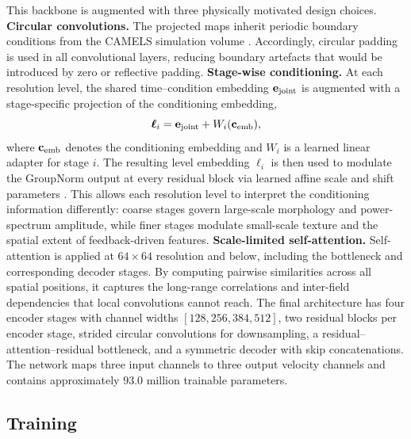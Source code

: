 \documentclass{article}
\begin{document}
This backbone is augmented with three physically motivated design
choices. \textbf{Circular convolutions.}
The projected maps inherit periodic boundary conditions from the
CAMELS simulation volume \citep{Villaescusa2022}. Accordingly,
circular padding is used in all convolutional layers, reducing boundary
artefacts that would be introduced by zero or reflective padding.
\textbf{Stage-wise conditioning.}
At each resolution level, the shared time--condition embedding
$\mathbf{e}_{\rm joint}$ is augmented with a
stage-specific projection of the conditioning embedding,
\begin{equation}
  \boldsymbol{\ell}_i
  =
  \mathbf{e}_{\rm joint} + W_i(\mathbf{c}_{\rm emb}),
  \label{eq:stage_embedding}
\end{equation}
where $\mathbf{c}_{\rm emb}$ denotes the conditioning embedding and
$W_i$ is a learned linear adapter for stage $i$. The
resulting level embedding $\boldsymbol{\ell}_i$ is then used to
modulate the GroupNorm \citep{Wu2018} output at every residual block
via learned affine scale and shift parameters \citep[FiLM;][]{Perez2018}.
This allows each resolution level to interpret the conditioning
information differently: coarse stages govern large-scale morphology
and power-spectrum amplitude, while finer stages modulate small-scale
texture and the spatial extent of feedback-driven features.
\textbf{Scale-limited self-attention.}
Self-attention \citep{Vaswani2017} is applied at $64\times64$
resolution and below, including the bottleneck and corresponding
decoder stages. By computing pairwise similarities across all spatial
positions, it captures the long-range correlations and
inter-field dependencies that local convolutions cannot reach.
The final architecture has four encoder stages with channel widths
$[128, 256, 384, 512]$, two residual blocks per encoder stage,
strided circular convolutions for downsampling, a
residual--attention--residual bottleneck, and a symmetric decoder
with skip concatenations. The network maps three input channels to
three output velocity channels and contains approximately $93.0$
million trainable parameters.

\subsection{Training}
\label{sec:training}
\end{document}
